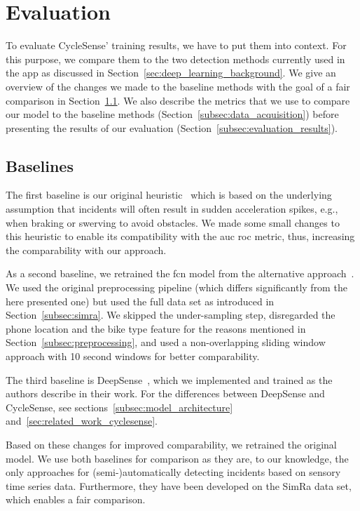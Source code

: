\section{Evaluation}
\label{sec:evaluation_cyclesense}
To evaluate CycleSense' training results, we have to put them into context. 
For this purpose, we compare them to the two detection methods currently used in the app as discussed in Section~\ref{sec:deep_learning_background}.
We give an overview of the changes we made to the baseline methods with the goal of a fair comparison in Section~\ref{subsec:baselines}.
We also describe the metrics that we use to compare our model to the baseline methods (Section~\ref{subsec:data_acquisition}) before presenting the results of our evaluation (Section~\ref{subsec:evaluation_results}).


\subsection{Baselines}
\label{subsec:baselines}
The first baseline is our original heuristic~\cite{karakaya2020simra} which is based on the underlying assumption that incidents will often result in sudden acceleration spikes, e.g., when braking or swerving to avoid obstacles.
We made some small changes to this heuristic to enable its compatibility with the \ac{auc} \ac{roc} metric, thus, increasing the comparability with our approach.

As a second baseline, we retrained the \ac{fcn} model from the alternative approach~\cite{sanchez2020detecting}.
We used the original preprocessing pipeline (which differs significantly from the here presented one) but used the full data set as introduced in Section~\ref{subsec:simra}.
We skipped the under-sampling step, disregarded the phone location and the bike type feature for the reasons mentioned in Section~\ref{subsec:preprocessing}, and used a non-overlapping sliding window approach with 10 second windows for better comparability.

The third baseline is DeepSense~\cite{yao2017deepsense}, which we implemented and trained as the authors describe in their work.
For the differences between DeepSense and CycleSense, see sections~\ref{subsec:model_architecture} and~\ref{sec:related_work_cyclesense}.

Based on these changes for improved comparability, we retrained the original model.
We use both baselines for comparison as they are, to our knowledge, the only approaches for (semi-)automatically detecting incidents based on sensory time series data.
Furthermore, they have been developed on the SimRa data set, which enables a fair comparison.

